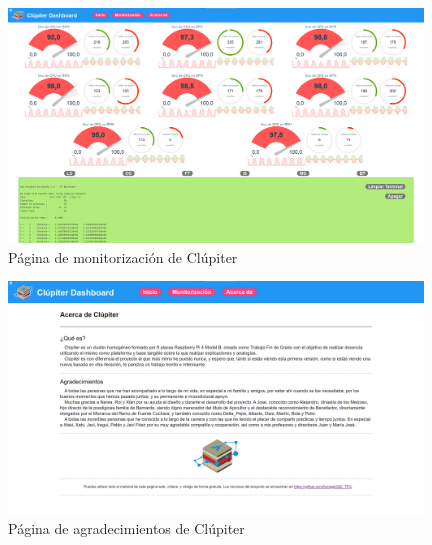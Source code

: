 \begin{figure}[h!]
  \centering
  \vspace{0.20cm}
  \includegraphics[width=0.98\textwidth]{img/dashboard/monitoring.png}
  \caption{Página de monitorización de Clúpiter}
  \label{fig:monitorizacion_clupiter}
\end{figure}

\begin{figure}[h!]
  \centering
  \vspace{0.20cm}
  \includegraphics[width=0.98\textwidth]{img/dashboard/agradecimientos.png}
  \caption{Página de agradecimientos de Clúpiter}
  \label{fig:agradecimientos_clupiter}
\end{figure}
